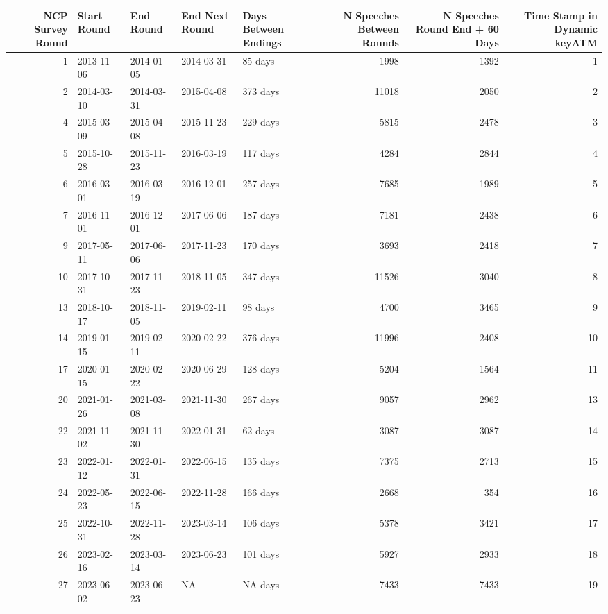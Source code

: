 
\begin{landscape}
\begin{tabular}[t]{rllllrrr}
\toprule
NCP Survey Round & Start  Round & End  Round & End Next  Round & Days Between  Endings & N Speeches Between  Rounds & N Speeches  Round End + 60 Days & Time Stamp in Dynamic keyATM\\
\midrule
1 & 2013-11-06 & 2014-01-05 & 2014-03-31 & 85 days & 1998 & 1392 & 1\\
2 & 2014-03-10 & 2014-03-31 & 2015-04-08 & 373 days & 11018 & 2050 & 2\\
4 & 2015-03-09 & 2015-04-08 & 2015-11-23 & 229 days & 5815 & 2478 & 3\\
5 & 2015-10-28 & 2015-11-23 & 2016-03-19 & 117 days & 4284 & 2844 & 4\\
6 & 2016-03-01 & 2016-03-19 & 2016-12-01 & 257 days & 7685 & 1989 & 5\\
7 & 2016-11-01 & 2016-12-01 & 2017-06-06 & 187 days & 7181 & 2438 & 6\\
9 & 2017-05-11 & 2017-06-06 & 2017-11-23 & 170 days & 3693 & 2418 & 7\\
10 & 2017-10-31 & 2017-11-23 & 2018-11-05 & 347 days & 11526 & 3040 & 8\\
13 & 2018-10-17 & 2018-11-05 & 2019-02-11 & 98 days & 4700 & 3465 & 9\\
14 & 2019-01-15 & 2019-02-11 & 2020-02-22 & 376 days & 11996 & 2408 & 10\\
17 & 2020-01-15 & 2020-02-22 & 2020-06-29 & 128 days & 5204 & 1564 & 11\\
20 & 2021-01-26 & 2021-03-08 & 2021-11-30 & 267 days & 9057 & 2962 & 13\\
22 & 2021-11-02 & 2021-11-30 & 2022-01-31 & 62 days & 3087 & 3087 & 14\\
23 & 2022-01-12 & 2022-01-31 & 2022-06-15 & 135 days & 7375 & 2713 & 15\\
24 & 2022-05-23 & 2022-06-15 & 2022-11-28 & 166 days & 2668 & 354 & 16\\
25 & 2022-10-31 & 2022-11-28 & 2023-03-14 & 106 days & 5378 & 3421 & 17\\
26 & 2023-02-16 & 2023-03-14 & 2023-06-23 & 101 days & 5927 & 2933 & 18\\
27 & 2023-06-02 & 2023-06-23 & NA & NA days & 7433 & 7433 & 19\\
\bottomrule
\end{tabular}
\end{landscape}
